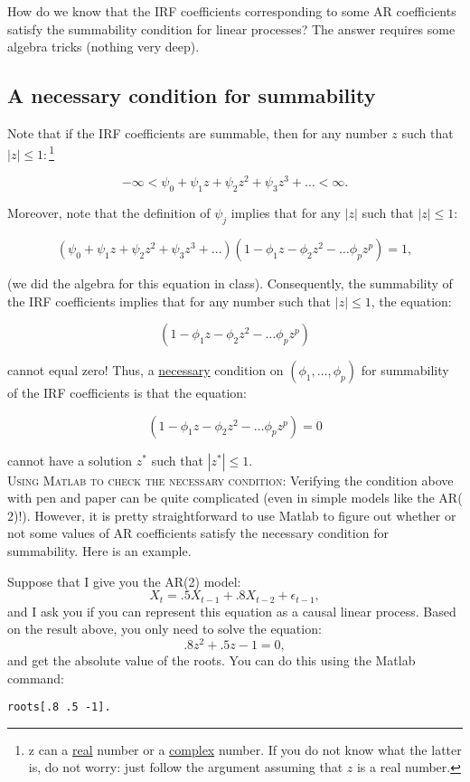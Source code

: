 \documentclass[12] {article}
\begin{document}
How do we know that the IRF coefficients corresponding to some AR coefficients satisfy the summability condition for linear processes? The answer requires some algebra tricks (nothing very deep). 

\subsection{A necessary condition for summability}

Note that if the IRF coefficients are summable, then for any number $z$ such that $|z| \leq 1:$\footnote{z can a \underline{real} number or a \underline{complex} number. If you do not know what the latter is, do not worry: just follow the argument assuming that $z$ is a real number.}

\[ -\infty < \psi_0 + \psi_1z + \psi_2z^2 + \psi_3 z^3 + \ldots   < \infty. \]

Moreover, note that the definition of $\psi_j$ implies that for any $|z|$ such that $|z|\leq 1$: 

\[ (\psi_0 + \psi_1 z + \psi_2 z^2 + \psi_3 z^3 + \ldots  ) (1 - \phi_1 z - \phi_2 z^2  - \ldots \phi_p z^p ) = 1, \]

\noindent (we did the algebra for this equation in class). Consequently, the summability of the IRF coefficients implies that for any number such that $|z| \leq 1$, the equation:

\[(1 - \phi_1 z - \phi_2 z^2  - \ldots \phi_p z^p ) \]

\noindent cannot equal zero! Thus, a \underline{necessary} condition on $(\phi_1, \ldots , \phi_p)$ for summability of the IRF coefficients is that the equation:

\begin{equation}
(1 - \phi_1 z - \phi_2 z^2  - \ldots \phi_p z^p ) = 0
\end{equation}

\noindent cannot have a solution $z^*$ such that $|z^*| \leq 1$. \\

{\scshape Using Matlab to check the necessary condition:} Verifying the condition above with pen and paper can be quite complicated (even in simple models like the AR($2$)!). However, it is pretty straightforward to use Matlab to figure out whether or not some values of AR coefficients satisfy the necessary condition for summability. Here is an example. 

Suppose that I give you the AR(2) model:
\begin{equation}
X_{t} = .5 X_{t-1} + .8 X_{t-2} + \epsilon_{t-1},
\end{equation}
and I ask you if you can represent this equation as a causal linear process. Based on the result above, you only need to solve the equation:
\[ .8 z^2 + .5 z -1 = 0, \]
and get the absolute value of the roots. You can do this using the Matlab command:
\begin{center}
\texttt{roots[.8 .5 -1].}
\end{center}
\end{document}
